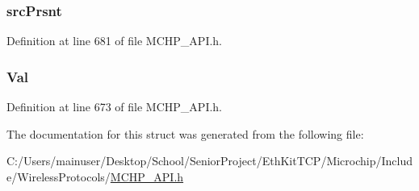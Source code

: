 \subsubsection[{src\+Prsnt}]{ src\+Prsnt}\label{struct_r_e_c_e_i_v_e_d___m_e_s_s_a_g_e_a76c243e278765426931ed3febf71e050}


Definition at line 681 of file M\+C\+H\+P\+\_\+\+A\+P\+I.\+h.

\hypertarget{struct_r_e_c_e_i_v_e_d___m_e_s_s_a_g_e_a5ab8c2bf45b20b5f7aa3a4f083896cec}{}
\subsubsection[{Val}]{ Val}\label{struct_r_e_c_e_i_v_e_d___m_e_s_s_a_g_e_a5ab8c2bf45b20b5f7aa3a4f083896cec}


Definition at line 673 of file M\+C\+H\+P\+\_\+\+A\+P\+I.\+h.



The documentation for this struct was generated from the following file\+:\begin{DoxyCompactItemize}
\item 
C\+:/\+Users/mainuser/\+Desktop/\+School/\+Senior\+Project/\+Eth\+Kit\+T\+C\+P/\+Microchip/\+Include/\+Wireless\+Protocols/\hyperlink{_m_c_h_p___a_p_i_8h}{M\+C\+H\+P\+\_\+\+A\+P\+I.\+h}\end{DoxyCompactItemize}
